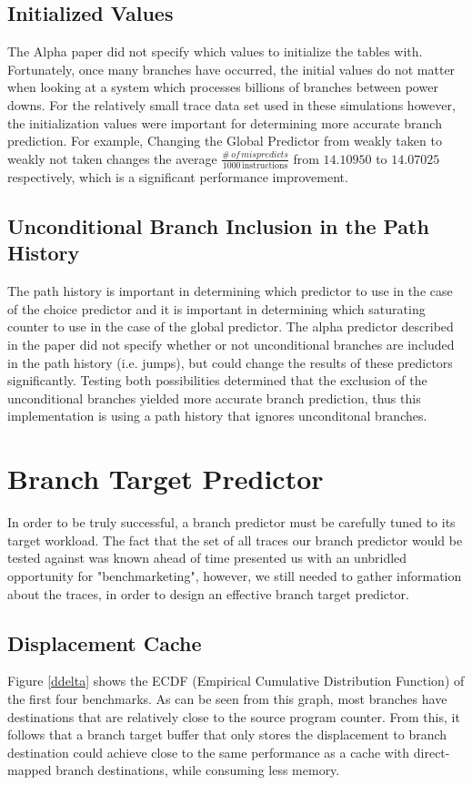 \documentclass[twocolumn]{article}
\begin{document}
\subsection{Initialized Values}

The Alpha paper did not specify which values to initialize the tables
with.  Fortunately, once many branches have occurred, the initial
values do not matter when looking at a system which processes billions
of branches between power downs.  For the relatively small trace data
set used in these simulations however, the initialization values were
important for determining more accurate branch prediction.  For
example, Changing the Global Predictor from weakly taken to weakly not
taken changes the average
$\frac{\#\,of\,mispredicts}{1000\,\text{instructions}}$ from
$14.10950$ to $14.07025$ respectively, which is a significant
performance improvement.
 
\subsection{Unconditional Branch Inclusion in the Path History}

The path history is important in determining which predictor to use
in the case of the choice predictor and it is important in determining
which saturating counter to use in the case of the global predictor.
The alpha predictor described in the paper did not specify whether or not
unconditional branches are included in the path history (i.e. jumps), but
could change the results of these predictors significantly. Testing both 
possibilities determined that the exclusion of the unconditional branches 
yielded more accurate branch prediction, thus this implementation is using
a path history that ignores unconditonal branches.

\section{Branch Target Predictor} 

In order to be truly successful, a branch predictor must be carefully
tuned to its target workload. The fact that the set of all traces our
branch predictor would be tested against was known ahead of time
presented us with an unbridled opportunity for "benchmarketing",
however, we still needed to gather information about the traces, in
order to design an effective branch target predictor.

\subsection{Displacement Cache}
Figure \ref{ddelta} shows the ECDF (Empirical Cumulative Distribution
Function) of the first four benchmarks. As can be seen from this
graph, most branches have destinations that are relatively close to
the source program counter. From this, it follows that a branch target
buffer that only stores the displacement to branch destination could
achieve close to the same performance as a cache with direct-mapped
branch destinations, while consuming less memory.
\end{document}
